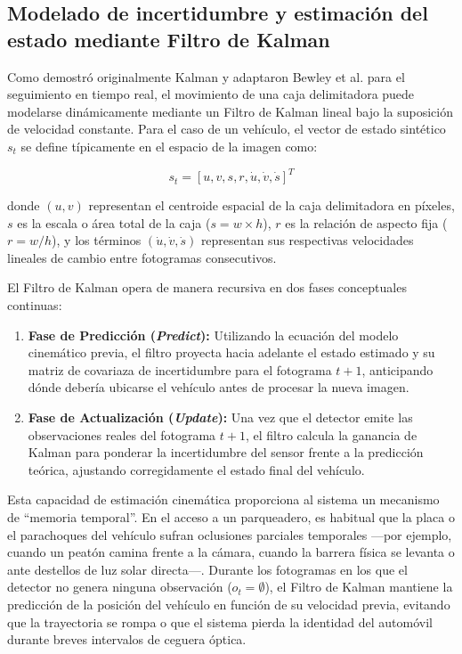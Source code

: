 \subsection{Modelado de incertidumbre y estimación del estado mediante Filtro de Kalman}

Como demostró originalmente Kalman \cite{kalman1960new} y adaptaron Bewley et al.
\cite{bewley2016sort} para el seguimiento en tiempo real, el movimiento de una
caja delimitadora puede modelarse dinámicamente mediante un Filtro de Kalman
lineal bajo la suposición de velocidad constante. Para el caso de un vehículo,
el vector de estado sintético $s_t$ se define típicamente en el espacio de la
imagen como:

\begin{equation}
s_t = [u, v, s, r, \dot{u}, \dot{v}, \dot{s}]^T
\end{equation}

donde $(u, v)$ representan el centroide espacial de la caja delimitadora en
píxeles, $s$ es la escala o área total de la caja ($s = w \times h$), $r$ es la
relación de aspecto fija ($r = w / h$), y los términos $(\dot{u}, \dot{v}, \dot{s})$
representan sus respectivas velocidades lineales de cambio entre fotogramas
consecutivos.

El Filtro de Kalman opera de manera recursiva en dos fases conceptuales continuas:

\begin{enumerate}
    \item \textbf{Fase de Predicción (\textit{Predict}):} Utilizando la ecuación
        del modelo cinemático previa, el filtro proyecta hacia adelante el
        estado estimado y su matriz de covariaza de incertidumbre para el
        fotograma $t+1$, anticipando dónde debería ubicarse el vehículo antes de
        procesar la nueva imagen.
    \item \textbf{Fase de Actualización (\textit{Update}):} Una vez que el
        detector emite las observaciones reales del fotograma $t+1$, el filtro
        calcula la ganancia de Kalman para ponderar la incertidumbre del sensor
        frente a la predicción teórica, ajustando corregidamente el estado final
        del vehículo.
\end{enumerate}

Esta capacidad de estimación cinemática proporciona al sistema un mecanismo de
``memoria temporal''. En el acceso a un parqueadero, es habitual que la placa o
el parachoques del vehículo sufran oclusiones parciales temporales —por ejemplo,
cuando un peatón camina frente a la cámara, cuando la barrera física se levanta
o ante destellos de luz solar directa—. Durante los fotogramas en los que el
detector no genera ninguna observación ($o_t = \emptyset$), el Filtro de Kalman
mantiene la predicción de la posición del vehículo en función de su velocidad
previa, evitando que la trayectoria se rompa o que el sistema pierda la
identidad del automóvil durante breves intervalos de ceguera óptica.

